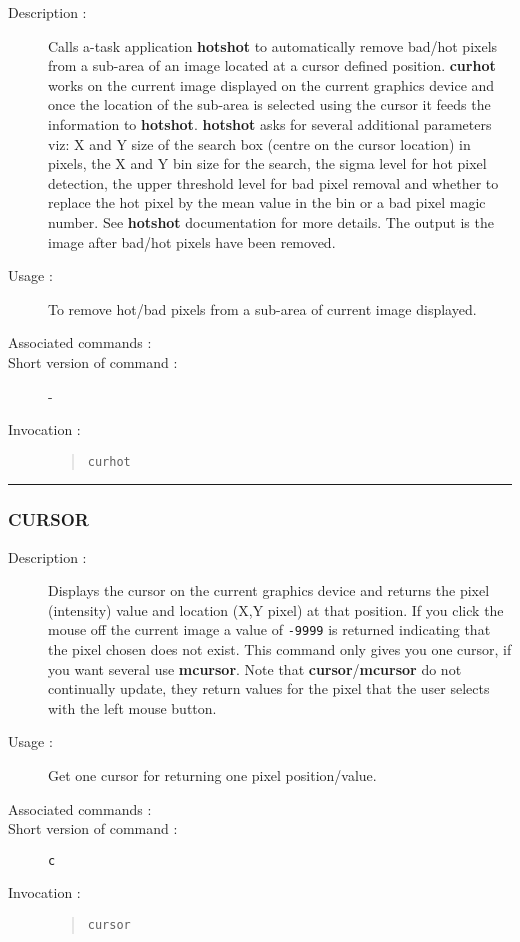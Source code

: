 \begin{description}

\item[Description :] Calls a-task application {\bf hotshot} to automatically
remove bad/hot pixels from a sub-area of an image located at a cursor
defined position.  {\bf curhot} works on the current image displayed on the
current graphics device and once the location of the sub-area is
selected using the cursor it feeds the information to {\bf hotshot}.
{\bf hotshot} asks for several additional parameters viz: X and Y size
of the search box (centre on the cursor location) in pixels, the X and
Y bin size for the search, the sigma level for hot pixel detection, the
upper threshold level for bad pixel removal and whether to replace the
hot pixel by the mean value in the bin or a bad pixel magic number.
See {\bf hotshot} documentation for more details. The output is the
image after bad/hot pixels have been removed.

\item[Usage :] To remove hot/bad pixels from a sub-area of current image
displayed.
\item[Associated commands :] {\tt {}}
\item[Short version of command :] -
\item[Invocation :]

\begin{quote}{\tt  curhot }\end{quote}

\end{description}

\hrule
\subsubsection*{\label{CURSOR}CURSOR}

\begin{description}

\item[Description :] Displays the cursor on the current graphics device
and returns the pixel (intensity) value and location (X,Y pixel) at
that position. If you click the mouse off the current image a value of
{\tt -9999} is returned indicating that the pixel chosen does not
exist. This command only gives you one cursor, if you want several use
{\bf mcursor}. Note that {\bf cursor}/{\bf mcursor} do not continually
update, they return values for the pixel that the user selects with the
left mouse button.

\item[Usage :] Get one cursor for returning one pixel position/value.
\item[Associated commands :] {\tt {}}
\item[Short version of command :] {\tt c}
\item[Invocation :]

\begin{quote}{\tt  cursor }\end{quote}

\end{description}

